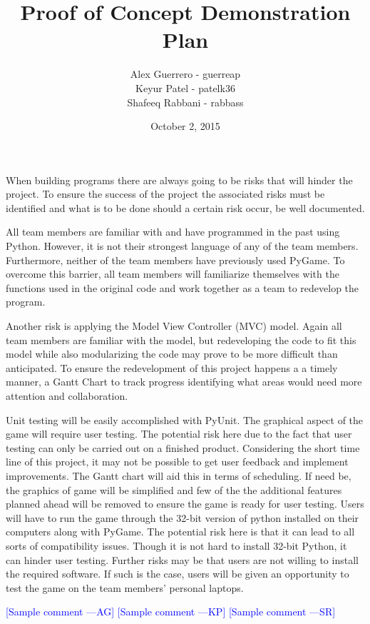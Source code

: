 \documentclass[12pt]{article}
\newcommand{\authornote}[3]{\textcolor{#1}{[#3 ---#2]}}
\newcommand{\authornote}[3]{}
\newcommand{\ag}[1]{\authornote{blue}{AG}{#1}} %
\newcommand{\kp}[1]{\authornote{blue}{KP}{#1}} %
\newcommand{\sr}[1]{\authornote{blue}{SR}{#1}} %
\begin{document}
\title{Proof of Concept Demonstration Plan} 
\author{Alex Guerrero - guerreap\\Keyur Patel - patelk36\\Shafeeq Rabbani - rabbass}
\date{October 2, 2015}
	
\maketitle
	When building programs there are always going to be risks that will hinder the project. To ensure the success of the project the associated risks must be identified and what is to be done should a certain risk occur, be well documented.\par
	All team members are familiar with and have programmed in the past using Python. However, it is not their strongest language of any of the team members. Furthermore, neither of the team members have previously used PyGame. To overcome this barrier, all team members will familiarize themselves with the functions used in the original code and work together as a team to redevelop the program.\par
	Another risk is applying the Model View Controller (MVC) model. Again all team members are familiar with the model, but redeveloping the code to fit this model while also modularizing the code may prove to be more difficult than anticipated. To ensure the redevelopment of this project happens a a timely manner, a Gantt Chart to track progress identifying what areas would need more attention and collaboration.\par
	Unit testing will be easily accomplished with PyUnit. The graphical aspect of the game will require user testing. The potential risk here due to the fact that user testing can only be carried out on a finished product. Considering the short time line of this project, it may not be possible to get user feedback and implement improvements. The Gantt chart will aid this in terms of scheduling. If need be, the graphics of game will be simplified and few of the the additional features planned ahead will be removed to ensure the game is ready for user testing. 	 
	 Users will have to run the game through the 32-bit version of python installed on their computers along with PyGame. The potential risk here is that it can lead to all sorts of compatibility issues. Though it is not hard to install 32-bit Python, it can hinder user testing. Further risks may be that users are not willing to install the required software. If such is the case, users will be given an opportunity to test the game on the team members' personal laptops.\par


\ag{Sample comment}
\kp{Sample comment}
\sr{Sample comment}
\end{document}
